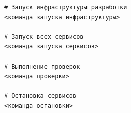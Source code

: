 \documentclass[12pt,a4paper]{extarticle}
\begin{document}
\begin{verbatim}
# Запуск инфраструктуры разработки
<команда запуска инфраструктуры>

# Запуск всех сервисов
<команда запуска сервисов>

# Выполнение проверок
<команда проверки>

# Остановка сервисов
<команда остановки>
\end{verbatim}

\clearpage


\end{document}
